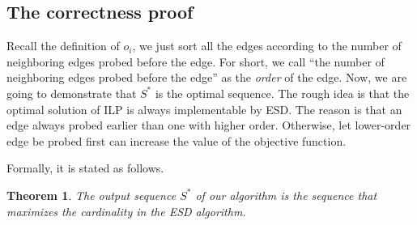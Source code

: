 \documentclass[letterpaper]{article}
\newtheorem{theorem}{Theorem}%
\begin{document}
\subsection{The correctness proof}
Recall the definition of $o_i$, we just sort all the edges according to the number of neighboring edges probed before the edge.
For short, we call ``the number of neighboring edges probed before the edge'' as the \textit{order} of the edge.
Now, we are going to demonstrate that $S^*$ is the optimal sequence.
The rough idea is that the optimal solution of ILP is always implementable by ESD.
The reason is that an edge always probed earlier than one with higher order.
Otherwise, let lower-order edge be probed first can increase the value of the objective function.

Formally, it is stated as follows.

\begin{theorem}
	The output sequence $S^*$ of our algorithm is the sequence that maximizes the cardinality in the ESD algorithm.
\end{theorem}
\end{document}
